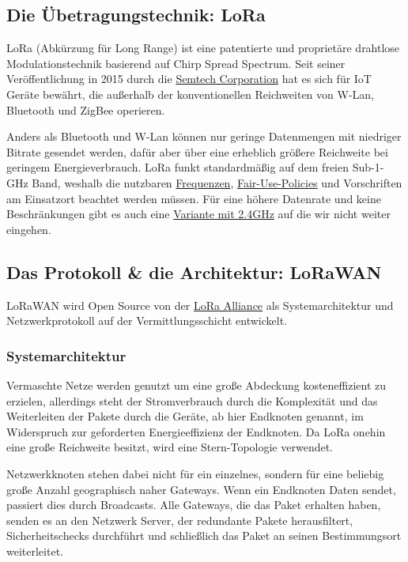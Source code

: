 \documentclass[12pt]{article}
\begin{document}
    \subsection{Die Übetragungstechnik: LoRa}
      LoRa (Abkürzung für Long Range) ist eine patentierte und proprietäre drahtlose Modulationstechnik basierend auf Chirp Spread Spectrum.
      Seit seiner Veröffentlichung in 2015 durch die \href{www.semtech.com}{Semtech Corporation} hat es sich für
      IoT Geräte bewährt, die außerhalb der konventionellen Reichweiten von W-Lan, Bluetooth und ZigBee operieren.

      Anders als Bluetooth und W-Lan können nur geringe Datenmengen mit niedriger Bitrate gesendet werden,
      dafür aber über eine erheblich größere Reichweite bei geringem Energieverbrauch. LoRa funkt standardmäßig auf dem freien Sub-1-GHz Band,
      weshalb die nutzbaren \href{https://www.thethingsnetwork.org/docs/lorawan/frequencies-by-country/}{Frequenzen}, \href{https://www.thethingsnetwork.org/docs/lorawan/duty-cycle/}{Fair-Use-Policies}
      und Vorschriften am Einsatzort beachtet werden müssen. Für eine höhere Datenrate und keine Beschränkungen gibt es auch eine
      \href{https://www.semtech.com/products/wireless-rf/lora-24ghz}{Variante mit 2.4GHz} auf die wir nicht weiter eingehen.



    \subsection{Das Protokoll \& die Architektur: LoRaWAN}
      LoRaWAN wird Open Source von der \href{https://lora-alliance.org/}{LoRa Alliance} als Systemarchitektur und Netzwerkprotokoll
      auf der Vermittlungsschicht entwickelt.

      \subsubsection{Systemarchitektur}
        Vermaschte Netze werden genutzt um eine große Abdeckung kosteneffizient zu erzielen, allerdings steht der Stromverbrauch durch die Komplexität und das
        Weiterleiten der Pakete durch die Geräte, ab hier Endknoten genannt, im Widerspruch zur geforderten Energieeffizienz der Endknoten.
        Da LoRa onehin eine große Reichweite besitzt, wird eine Stern-Topologie verwendet.

        Netzwerkknoten stehen dabei nicht für ein einzelnes, sondern für
        eine beliebig große Anzahl geographisch naher Gateways. Wenn ein Endknoten Daten sendet, passiert dies durch Broadcasts.
        Alle Gateways, die das Paket erhalten haben, senden es an den Netzwerk Server, der redundante Pakete herausfiltert,
        Sicherheitschecks durchführt und schließlich das Paket an seinen Bestimmungsort weiterleitet.
\end{document}
